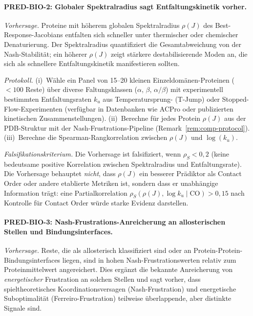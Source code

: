 \documentclass[12pt,a4paper]{article}
\theoremstyle{remark}
\begin{document}
\paragraph{PRED-BIO-2: Globaler Spektralradius sagt Entfaltungskinetik vorher.}

\textit{Vorhersage.}
Proteine mit h\"oherem globalen Spektralradius $\rho(J)$ des Best-Response-Jacobians entfalten sich schneller unter thermischer oder chemischer Denaturierung. Der Spektralradius quantifiziert die Gesamtabweichung von der Nash-Stabilit\"at; ein h\"oherer $\rho(J)$ zeigt st\"arkere destabilisierende Moden an, die sich als schnellere Entfaltungskinetik manifestieren sollten.

\textit{Protokoll.}
(i)~W\"ahle ein Panel von 15--20 kleinen Einzeldom\"anen-Proteinen ($< 100$ Reste) \"uber diverse Faltungsklassen ($\alpha$, $\beta$, $\alpha/\beta$) mit experimentell bestimmten Entfaltungsraten $k_u$ aus Temperatursprung- (T-Jump) oder Stopped-Flow-Experimenten (verf\"ugbar in Datenbanken wie ACPro oder publizierten kinetischen Zusammenstellungen).
(ii)~Berechne f\"ur jedes Protein $\rho(J)$ aus der PDB-Struktur mit der Nash-Frustrations-Pipeline (Remark~\ref{rem:comp-protocol}).
(iii)~Berechne die Spearman-Rangkorrelation zwischen $\rho(J)$ und $\log(k_u)$.

\textit{Falsifikationskriterium.}
Die Vorhersage ist falsifiziert, wenn $\rho_S < 0{,}2$ (keine bedeutsame positive Korrelation zwischen Spektralradius und Entfaltungsrate). Die Vorhersage behauptet \emph{nicht}, dass $\rho(J)$ ein besserer Pr\"adiktor als Contact Order oder andere etablierte Metriken ist, sondern dass er unabh\"angige Information tr\"agt: eine Partialkorrelation $\rho_S(\rho(J), \log k_u \mid \text{CO}) > 0{,}15$ nach Kontrolle f\"ur Contact Order w\"urde starke Evidenz darstellen.

\paragraph{PRED-BIO-3: Nash-Frustrations-Anreicherung an allosterischen Stellen und Bindungsinterfaces.}

\textit{Vorhersage.}
Reste, die als allosterisch klassifiziert sind oder an Protein-Protein-Bindungsinterfaces liegen, sind in hohen Nash-Frustrationswerten relativ zum Proteinmittelwert angereichert. Dies erg\"anzt die bekannte Anreicherung von \emph{energetischer} Frustration an solchen Stellen \citep{Ferreiro2014} und sagt vorher, dass spieltheoretisches Koordinationsversagen (Nash-Frustration) und energetische Suboptimalit\"at (Ferreiro-Frustration) teilweise \"uberlappende, aber distinkte Signale sind.
\end{document}
